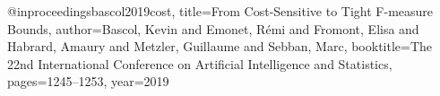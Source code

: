 @inproceedings{bascol2019cost,
  title={From Cost-Sensitive to Tight F-measure Bounds},
  author={Bascol, Kevin and Emonet, R{\'e}mi and Fromont, Elisa and Habrard, Amaury and Metzler, Guillaume and Sebban, Marc},
  booktitle={The 22nd International Conference on Artificial Intelligence and Statistics},
  pages={1245--1253},
  year={2019}
}